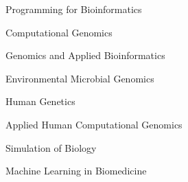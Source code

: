\vspace{\acvSectionContentTopSkip}
{\acvPublicationStyle

\begin{minipage}[t]{.5\linewidth}
  \begin{cvitems}
    \item Programming for Bioinformatics
    \item Computational Genomics
    \item Genomics and Applied Bioinformatics
    \item Environmental Microbial Genomics
  \end{cvitems}
\end{minipage}%
\begin{minipage}[t]{.5\linewidth}
  \begin{cvitems}
    \item Human Genetics
    \item Applied Human Computational Genomics
    \item Simulation of Biology
    \item Machine Learning in Biomedicine
  \end{cvitems}
\end{minipage}
}
\vspace{4.5mm}